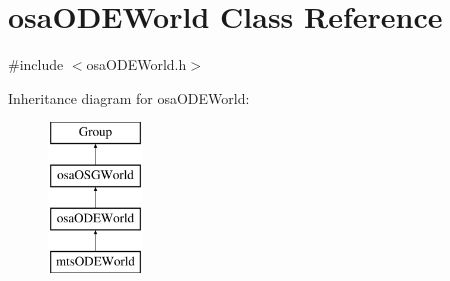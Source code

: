 \hypertarget{classosa_o_d_e_world}{\section{osa\-O\-D\-E\-World Class Reference}
\label{classosa_o_d_e_world}
}


{\ttfamily \#include $<$osa\-O\-D\-E\-World.\-h$>$}

Inheritance diagram for osa\-O\-D\-E\-World\-:\begin{figure}[H]
\begin{center}
\leavevmode
\includegraphics[height=4.000000cm]{d6/d94/classosa_o_d_e_world}
\end{center}
\end{figure}
